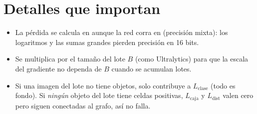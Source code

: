 \section{Detalles que importan}

\begin{itemize}
  \item La pérdida se calcula en  aunque la red corra en
         (precisión mixta): los logaritmos y las sumas grandes pierden
        precisión en 16 bits.
  \item Se multiplica por el tamaño del lote $B$ (como Ultralytics) para que la escala
        del gradiente no dependa de $B$ cuando se acumulan lotes.
  \item Si una imagen del lote no tiene objetos, solo contribuye a $L_{\text{clase}}$
        (todo es fondo). Si \emph{ningún} objeto del lote tiene celdas positivas,
        $L_{\text{caja}}$ y $L_{\text{dist}}$ valen cero pero siguen conectadas al
        grafo, así  no falla.
\end{itemize}
